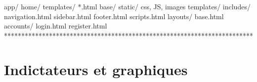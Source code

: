 \documentclass[letterpaper,10pt,french]{sphinxmanual}
\begin{document}
\begin{sphinxVerbatim}[commandchars=\\\{\}]
\PYGZhy{}\PYGZhy{} app/
    \PYGZhy{}\PYGZhy{} home/
         \PYGZhy{}\PYGZhy{} templates/                       
                 \PYGZhy{}\PYGZhy{} *.html
    \PYGZhy{}\PYGZhy{} base/
         \PYGZhy{}\PYGZhy{} static/
             \PYGZhy{}\PYGZhy{} \PYGZlt{}css, JS, images\PYGZgt{}          
         
         \PYGZhy{}\PYGZhy{} templates/                      
              
              \PYGZhy{}\PYGZhy{} includes/
                  \PYGZhy{}\PYGZhy{} navigation.html       
                  \PYGZhy{}\PYGZhy{} sidebar.html          
                  \PYGZhy{}\PYGZhy{} footer.html           
                  \PYGZhy{}\PYGZhy{} scripts.html          
              
              \PYGZhy{}\PYGZhy{} layouts/                   
                  \PYGZhy{}\PYGZhy{} base.html             
              
              \PYGZhy{}\PYGZhy{} accounts/                  
                   \PYGZhy{}\PYGZhy{} login.html            
                   \PYGZhy{}\PYGZhy{} register.html         
\PYGZhy{}\PYGZhy{} ************************************************************************
\end{sphinxVerbatim}


\section{Indictateurs et graphiques}
\label{\detokenize{indicateurs:indictateurs-et-graphiques}}\label{\detokenize{indicateurs:indic}}\label{\detokenize{indicateurs::doc}}
\end{document}
